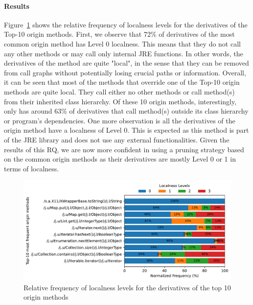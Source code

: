 \paragraph{Results}
Figure~\ref{ch2:fig:localness} shows the relative frequency of localness levels for the derivatives of the Top-10 origin methods. First, we observe that 72\% of derivatives of the most common origin method  has Level 0 localness. This means that they do not call any other methods or may call only internal JRE functions. In other words, the derivatives of the method  are quite "local", in the sense that they can be removed from call graphs without potentially losing crucial paths or information. Overall, it can be seen that most of the methods that override one of the Top-10 origin methods are quite local. They call either no other methods or call method(s) from their inherited class hierarchy. Of these 10 origin methods, interestingly, only  has around 63\% of derivatives that call method(s) outside its class hierarchy or program's dependencies. One more observation is all the derivatives of the origin method  have a localness of Level 0. This is expected as this method is part of the JRE library and does not use any external functionalities. Given the results of this RQ, we are now more confident in using a pruning strategy based on the common origin methods as their derivatives are mostly Level 0 or 1 in terms of localness.

\begin{figure}
    \centering
    \includegraphics[width=\columnwidth]{chapters/ch2/figs/localness_normalized.pdf}
    \caption{Relative frequency of localness levels for the derivatives of the top 10 origin methods}
    \label{ch2:fig:localness}
\end{figure}

